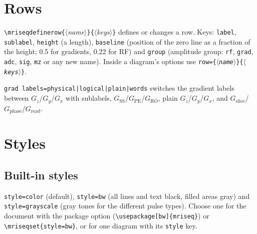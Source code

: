 \documentclass[11pt]{article}
\newcommand\cs[1]{\texttt{\textbackslash#1}}
\newcommand\key[1]{\texttt{#1}}
\newcommand\meta[1]{\ensuremath{\langle}\textit{#1}\ensuremath{\rangle}}
\newcommand\marg[1]{\texttt{\{}\meta{#1}\texttt{\}}}
\begin{document}
\section{Rows}\label{sec:rows}
\cs{mriseqdefinerow}\marg{name}\marg{keys} defines or changes a row. Keys:
\key{label}, \key{sublabel}, \key{height} (a length), \key{baseline}
(position of the zero line as a fraction of the height; 0.5 for gradients,
0.22 for RF) and \key{group} (amplitude group: \texttt{rf}, \texttt{grad},
\texttt{adc}, \texttt{sig}, \texttt{mz} or any new name). Inside a diagram's
options use \key{row=\{\meta{name}\}\{\meta{keys}\}}.

\key{grad labels=physical|logical|plain|words} switches the gradient labels
between $G_z$/$G_y$/$G_x$ with sublabels, $G_\mathrm{SS}$/$G_\mathrm{PE}$/$G_\mathrm{RO}$,
plain $G_z$/$G_y$/$G_x$, and $G_\mathrm{slice}$/$G_\mathrm{phase}$/$G_\mathrm{read}$.

\begin{example}
\begin{mriseq}[rows={rf,gs,gx}, grad labels=logical, row={rf}{label=$B_1$}]
  \gradientecho[signal=false]
\end{mriseq}
\end{example}

\section{Styles}
\subsection{Built-in styles}
\key{style=color} (default), \key{style=bw} (all lines and text black, filled
areas gray) and \key{style=grayscale} (gray tones for the different pulse
types). Choose one for the document with the package option
(\verb|\usepackage[bw]{mriseq}|) or \verb|\mriseqset{style=bw}|, or for one
diagram with its \key{style} key.

\begin{example}
\GradientEchoDiagram[style=bw, rows={rf,gz,gy,gx,sig}, spoiler]
\end{example}
\begin{example}
\InversionRecoveryDiagram[style=grayscale, rows={rf,gz,gy,gx,adc}]
\end{example}
\end{document}
